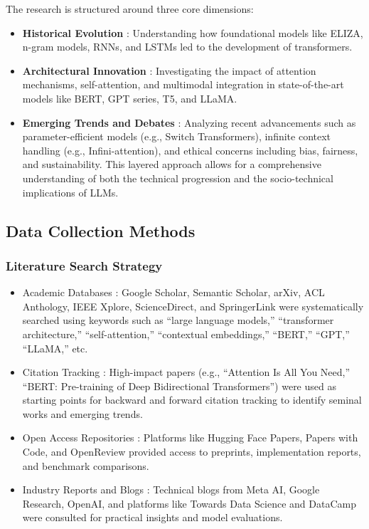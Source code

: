 \documentclass[conference]{IEEEtran}
\begin{document}
The research is structured around three core dimensions:
\begin{itemize}
    \item \textbf{Historical Evolution} : Understanding how foundational models like ELIZA, n-gram models, RNNs, and LSTMs led to the development of transformers. 
    \item \textbf{Architectural Innovation} : Investigating the impact of attention mechanisms, self-attention, and multimodal integration in state-of-the-art models like BERT, GPT series, T5, and LLaMA.
    \item \textbf{Emerging Trends and Debates} : Analyzing recent advancements such as parameter-efficient models (e.g., Switch Transformers), infinite context handling (e.g., Infini-attention), and ethical concerns including bias, fairness, and sustainability.
This layered approach allows for a comprehensive understanding of both the technical progression and the socio-technical implications of LLMs.
\end{itemize}

\subsection{Data Collection Methods}
\subsubsection{Literature Search Strategy}
\begin{itemize}
    \item Academic Databases : Google Scholar, Semantic Scholar, arXiv, ACL Anthology, IEEE Xplore, ScienceDirect, and SpringerLink were systematically searched using keywords such as “large language models,” “transformer architecture,” “self-attention,” “contextual embeddings,” “BERT,” “GPT,” “LLaMA,” etc.
    \item Citation Tracking : High-impact papers (e.g., “Attention Is All You Need,” “BERT: Pre-training of Deep Bidirectional Transformers”) were used as starting points for backward and forward citation tracking to identify seminal works and emerging trends.
    \item Open Access Repositories : Platforms like Hugging Face Papers, Papers with Code, and OpenReview provided access to preprints, implementation reports, and benchmark comparisons.
    \item Industry Reports and Blogs : Technical blogs from Meta AI, Google Research, OpenAI, and platforms like Towards Data Science and DataCamp were consulted for practical insights and model evaluations.
\end{itemize}
\end{document}
